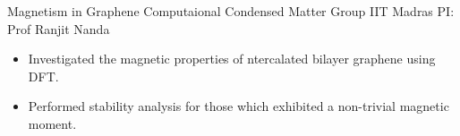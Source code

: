 
        {Magnetism in Graphene}
        {\newline Computaional Condensed Matter Group}
        {IIT Madras}
        {PI: Prof Ranjit Nanda}{
    \begin{itemize}
        \item Investigated the magnetic properties of ntercalated bilayer graphene using DFT.
        \item Performed stability analysis for those which exhibited a non-trivial magnetic moment. 
    \end{itemize}
}
